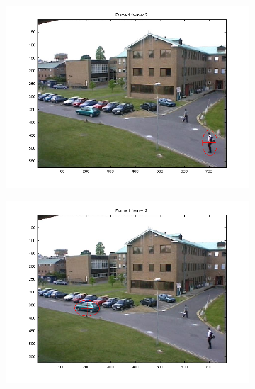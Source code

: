\documentclass[hyperref={pdfpagelabels=false}]{beamer}
\begin{document}
\begin{frame}
\begin{figure}
\begin{subfigure}[b]{0.4\textwidth}
         \end{subfigure}
         \\
         \begin{subfigure}[b]{0.4\textwidth}
                 \includegraphics[width=\textwidth]{results/PETS01D1Human1man/Frame0001.png}
         \end{subfigure}
         \begin{subfigure}[b]{0.4\textwidth}
                  \includegraphics[width=\textwidth]{results/PETS01D1Human1car/Frame0001.png}
         \end{subfigure}
\end{figure}

\end{frame}
\end{document}
